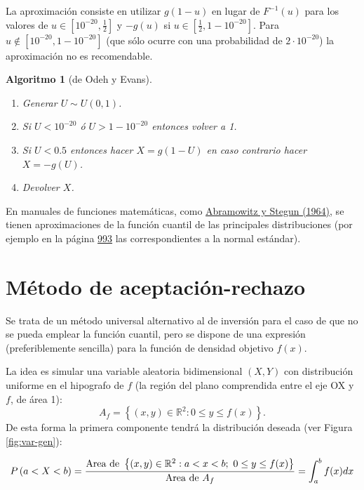 \documentclass[
  10pt,
]{book}
\theoremstyle{break}
\newtheorem{conjecture}{Algoritmo}[chapter]
\theoremstyle{nonumberplain}
\begin{document}
La aproximación consiste en utilizar \(g\left( 1-u\right)\) en lugar de \(F^{-1}\left( u\right)\) para los valores de \(u\in[10^{-20},\frac12]\) y \(-g\left( u\right)\) si \(u\in[\frac12,1-10^{-20}]\).
Para \(u \notin [10^{-20},1-10^{-20}]\) (que sólo ocurre con una probabilidad de \(2\cdot10^{-20}\)) la aproximación no es recomendable.

\begin{conjecture}[de Odeh y Evans]
\protect\hypertarget{cnj:Odeh-Evans}{}\label{cnj:Odeh-Evans}

\begin{enumerate}
\def\labelenumi{\arabic{enumi}.}
\item
  Generar \(U \sim U(0, 1)\).
\item
  Si \(U<10^{-20}\) ó \(U>1-10^{-20}\) entonces volver a 1.
\item
  Si \(U<0.5\) entonces hacer \(X=g\left(1-U\right)\)
  en caso contrario hacer \(X=-g\left( U\right)\).
\item
  Devolver \(X\).
\end{enumerate}

\end{conjecture}

En manuales de funciones matemáticas, como \href{https://www.math.ubc.ca/~cbm/aands/frameindex.htm}{Abramowitz y Stegun (1964)}, se tienen aproximaciones de la función cuantil de las principales distribuciones (por ejemplo en la página \href{https://www.math.ubc.ca/~cbm/aands/page_933.htm}{993} las correspondientes a la normal estándar).

\hypertarget{AR}{%
\section{Método de aceptación-rechazo}\label{AR}}

Se trata de un método universal alternativo al de inversión para el caso de que no se pueda emplear la función cuantil, pero se dispone de una expresión (preferiblemente sencilla) para la función de densidad objetivo \(f\left( x \right)\).

La idea es simular una variable aleatoria bidimensional \(\left( X, Y\right)\) con distribución uniforme en el hipografo de \(f\) (la región del plano comprendida entre el eje OX y \(f\), de área 1):
\[A_{f}=\left\{ \left( x,y\right) \in \mathbb{R}^{2}:0\leq y\leq f(x) \right\}.\]
De esta forma la primera componente tendrá la distribución deseada (ver Figura \ref{fig:var-gen}):

\[ P\left( a<X<b\right) = \frac{\text{Area de }\left\{ \left( x,y\right) \in 
\mathbb{R}^{2}:a<x<b;~0\leq y\leq f(x) \right\} }{\text{Area de }
A_{f}} \\
= \int_{a}^{b}f(x) dx \]
\end{document}
